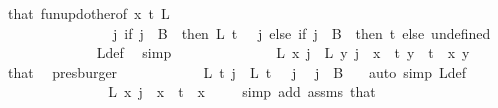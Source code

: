 \begin{isabellebody}
\ that\ fun{\isacharunderscore}{\kern0pt}upd{\isacharunderscore}{\kern0pt}other{\isacharbrackleft}{\kern0pt}of\ x\ t\ L\isanewline
\ \ \ \ \ \ \ \ \ \ \ \ \ \ \ \ {\isachardoublequoteopen}{\isasymlambda}j{\isachardot}{\kern0pt}\ if\ j\ {\isasymin}\ B\ {}\ then\ L\ {\isacharparenleft}{\kern0pt}t\ {\isacharminus}{\kern0pt}\ {}{\isacharparenright}{\kern0pt}\ j\ else\ if\ j\ {\isasymin}\ B\ {}\ then\ t\ else\ undefined{\isachardoublequoteclose}{\isacharbrackright}{\kern0pt}\isanewline
\ \ \ \ \ \ \ \ \ \ \ \ \isamarkupfalse%
\ L{\isacharprime}{\kern0pt}{\isacharunderscore}{\kern0pt}def\ \isamarkupfalse%
\ simp\isanewline
\ \ \ \ \ \ \ \ \ \ \isamarkupfalse%
\ \isamarkupfalse%
\ {\isacharasterisk}{\kern0pt}{\isacharcolon}{\kern0pt}\ {\isachardoublequoteopen}L{\isacharprime}{\kern0pt}\ x\ j\ {\isacharequal}{\kern0pt}\ L{\isacharprime}{\kern0pt}\ y\ j{\isachardoublequoteclose}\ \ {\isachardoublequoteopen}x\ {\isacharless}{\kern0pt}\ t{\isachardoublequoteclose}\ {\isachardoublequoteopen}y\ {\isacharless}{\kern0pt}\ t{\isachardoublequoteclose}\ \ x\ y\ \isamarkupfalse%
\ that\ \isamarkupfalse%
\ presburger\isanewline
\isanewline
\ \ \ \ \ \ \ \ \ \ \isamarkupfalse%
\ {\isachardoublequoteopen}L{\isacharprime}{\kern0pt}\ t\ j\ {\isacharequal}{\kern0pt}\ L{\isacharprime}{\kern0pt}\ {\isacharparenleft}{\kern0pt}t\ {\isacharminus}{\kern0pt}\ {}{\isacharparenright}{\kern0pt}\ j{\isachardoublequoteclose}\ \isamarkupfalse%
\ {\isacartoucheopen}j\ {\isasymin}\ B\ {}{\isacartoucheclose}\ \isamarkupfalse%
\ {\isacharparenleft}{\kern0pt}auto\ simp{\isacharcolon}{\kern0pt}\ L{\isacharprime}{\kern0pt}{\isacharunderscore}{\kern0pt}def{\isacharparenright}{\kern0pt}\isanewline
\ \ \ \ \ \ \ \ \ \ \isamarkupfalse%
\ \isamarkupfalse%
\ {\isachardoublequoteopen}{\isachardot}{\kern0pt}{\isachardot}{\kern0pt}{\isachardot}{\kern0pt}\ {\isacharequal}{\kern0pt}\ L{\isacharprime}{\kern0pt}\ x\ j{\isachardoublequoteclose}\ \ {\isachardoublequoteopen}x\ {\isacharless}{\kern0pt}\ t{\isachardoublequoteclose}\ \ x\ \isamarkupfalse%
\ {\isacharasterisk}{\kern0pt}\ \isamarkupfalse%
\ {\isacharparenleft}{\kern0pt}simp\ add{\isacharcolon}{\kern0pt}\ assms{\isacharparenleft}{\kern0pt}{}{\isacharparenright}{\kern0pt}\ that{\isacharparenright}{\kern0pt}\isanewline

\end{isabellebody}

